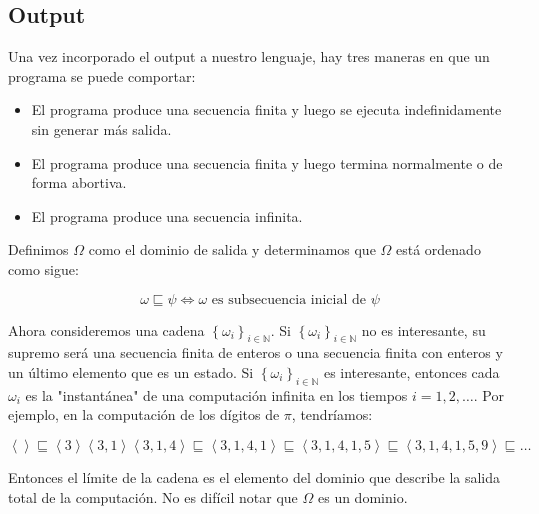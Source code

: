 \documentclass[a4paper, 12pt]{article}
\begin{document}
\pagebreak
\subsection{Output}


Una vez incorporado el output a nuestro lenguaje, hay tres maneras en que un
programa se puede comportar:

\begin{itemize}
  \item El programa produce una secuencia finita y luego se ejecuta indefinidamente sin generar más salida.
  \item El programa produce una secuencia finita y luego termina normalmente o de forma abortiva.
  \item El programa produce una secuencia infinita.
\end{itemize}

Definimos $\Omega$ como el dominio de salida y determinamos que $\Omega$ está ordenado como sigue:

\begin{equation*}
  \omega \sqsubseteq \psi \iff \omega \text{ es subsecuencia inicial de } \psi
\end{equation*}

Ahora consideremos una cadena $\left\{ \omega_i \right\}_{i \in \mathbb{N}}$. Si $\left\{\omega_i\right\}_{i \in \mathbb{N}}$ no es interesante, su supremo será una secuencia finita de enteros o una secuencia finita con enteros y un último elemento que es un estado. Si $\left\{\omega_i\right\}_{i \in \mathbb{N}}$ es interesante, entonces cada $\omega_i$ es la "instantánea" de una computación infinita en los tiempos $i = 1, 2, \ldots$. Por ejemplo, en la computación de los dígitos de $\pi$, tendríamos:

\begin{equation*}
  \left< \right> \sqsubseteq \left< 3 \right> \left<3, 1 \right> \left<3,1,4 \right> \sqsubseteq \left<3, 1, 4, 1 \right> \sqsubseteq  \left<3, 1, 4, 1, 5 \right> \sqsubseteq  \left<3, 1, 4, 1, 5, 9 \right> \sqsubseteq  \ldots
\end{equation*}

Entonces el límite de la cadena es el elemento del dominio que describe la
salida total de la computación. No es difícil notar que $\Omega$ es un dominio.
\end{document}
